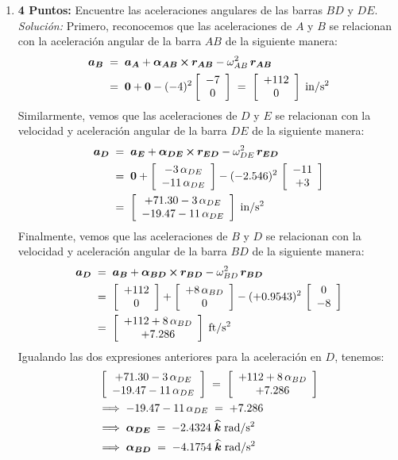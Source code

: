 \documentclass[ a4paper, twoside, 11pt]{article}
\begin{document}
\begin{problem}
\begin{enumerate}[label=\textbf{\alph*)}]
\item \textbf{4 Puntos:} Encuentre las aceleraciones angulares de las barras $BD$ y $DE$. \\[1ex]
\emph{Soluci\'on:} Primero, reconocemos que las aceleraciones de $A$ y $B$ se relacionan con la aceleraci\'on angular de la barra $AB$ de la siguiente manera: 
\begin{align*}
{\boldsymbol{a_B}} \;
& = \; {\boldsymbol{a_A}} + {\boldsymbol{\alpha_{AB}}} \,{\boldsymbol{\times}}\, {\boldsymbol{r_{AB}}} - \omega_{AB}^2 \, {\boldsymbol{r_{AB}}} \\
& = \; {\boldsymbol{0}} + {\boldsymbol{0}} -(-4)^2 \left[ \begin{array}{c} -7 \\ 0 \end{array} \right] \; = \; \left[ \begin{array}{c} +112 \\ 0 \end{array} \right] \; \text{in/s\ensuremath{^{\text{2}}}}
\end{align*}
Similarmente, vemos que las aceleraciones de $D$ y $E$ se relacionan con la velocidad y aceleraci\'on angular de la barra $DE$ de la siguiente manera: 
\begin{align*}
{\boldsymbol{a_D}} \;
& = \; {\boldsymbol{a_E}} + {\boldsymbol{\alpha_{DE}}} \,{\boldsymbol{\times}}\, {\boldsymbol{r_{ED}}} - \omega_{DE}^2 \, {\boldsymbol{r_{ED}}} \\
& = \; {\boldsymbol{0}} + \left[ \begin{array}{c}  -3 \, \alpha_{DE} \\  -11 \, \alpha_{DE} \end{array} \right] - (-2.546)^2 \, \left[ \begin{array}{c} -11 \\ +3 \end{array} \right] \\
& = \; 
\left[ \begin{array}{c}  +71.30 - 3 \, \alpha_{DE} \\  -19.47 - 11 \, \alpha_{DE} \end{array} \right] \; \text{in/s\ensuremath{^{\text{2}}}}
\end{align*}
Finalmente, vemos que las aceleraciones de $B$ y $D$ se relacionan con la velocidad y aceleraci\'on angular de la barra $BD$ de la siguiente manera: 
\begin{align*}
{\boldsymbol{a_D}} \;
& = \; {\boldsymbol{a_B}} + {\boldsymbol{\alpha_{BD}}} \,{\boldsymbol{\times}}\, {\boldsymbol{r_{BD}}} - \omega_{BD}^2 \, {\boldsymbol{r_{BD}}} \\
& = \; \left[ \begin{array}{c} +112 \\ 0 \end{array} \right] + \left[ \begin{array}{c}  +8 \, \alpha_{BD} \\ 0 \end{array} \right] - (+0.9543)^2 \, \left[ \begin{array}{c} 0 \\ -8 \end{array} \right] \\
& = \; 
\left[ \begin{array}{c}  +112 + 8 \, \alpha_{BD} \\ +7.286 \end{array} \right] \; \text{ft/s\ensuremath{^{\text{2}}}}
\end{align*}
Igualando las dos expresiones anteriores para la aceleraci\'on en $D$, tenemos: 
\begin{align*}
&
\left[ \begin{array}{c}  +71.30 - 3 \, \alpha_{DE} \\  -19.47 - 11 \, \alpha_{DE} \end{array} \right] \; = \; \left[ \begin{array}{c}  +112 + 8 \, \alpha_{BD} \\ +7.286 \end{array} \right] \\
& \Longrightarrow \;
-19.47 - 11 \, \alpha_{DE} \; = \; +7.286 \\
& \Longrightarrow \;
{\boldsymbol{\alpha_{DE}}} \; = \; -2.4324 \; {\boldsymbol{\widehat{k}}} \; \text{rad/s\ensuremath{^{\text{2}}}} \\
& \Longrightarrow \;
{\boldsymbol{\alpha_{BD}}} \; = \; -4.1754 \; {\boldsymbol{\widehat{k}}} \; \text{rad/s\ensuremath{^{\text{2}}}}
\end{align*}
\QED

\end{enumerate}

\end{problem}
\fullskip
\end{document}
